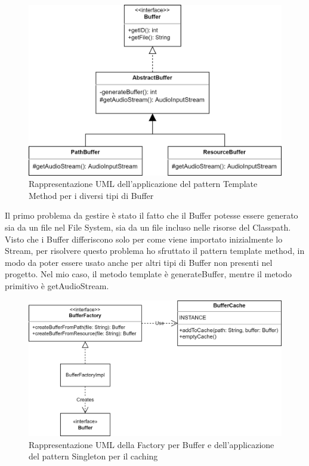 \documentclass[a4paper,12pt]{report}
\begin{document}
\begin{figure}[H]
\centering{}
\includegraphics[width=\textwidth]{img/buffer/Buffer.png}
\caption{Rappresentazione UML dell’applicazione del pattern Template Method per i diversi tipi di Buffer}
\label{img:templatebuffer}
\end{figure}
Il primo problema da gestire è stato il fatto che il Buffer potesse essere generato sia da un file nel File System, sia da un file incluso nelle risorse del Classpath. Visto che i Buffer differiscono solo per come viene importato inizialmente lo Stream, per risolvere questo problema ho sfruttato il pattern template method, in modo da poter essere usato anche per altri tipi di Buffer non presenti nel progetto. Nel mio caso, il metodo template è generateBuffer, mentre il metodo primitivo è getAudioStream.
%
\begin{figure}[H]
\centering{}
\includegraphics[width=\textwidth]{img/buffer/BufferImport.png}
\caption{Rappresentazione UML della Factory per Buffer e dell’applicazione del pattern Singleton per il caching}
\label{img:cachebuffer}
\end{figure}
\end{document}

